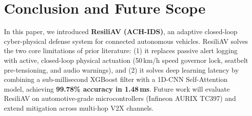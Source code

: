 \documentclass[conference]{IEEEtran}
\begin{document}
\section{Conclusion and Future Scope}
In this paper, we introduced \textbf{ResiliAV (ACH-IDS)}, an adaptive closed-loop cyber-physical defense system for connected autonomous vehicles. ResiliAV solves the two core limitations of prior literature: (1) it replaces passive alert logging with active, closed-loop physical actuation (50\,km/h speed governor lock, seatbelt pre-tensioning, and audio warnings), and (2) it solves deep learning latency by combining a sub-millisecond XGBoost filter with a 1D-CNN Self-Attention model, achieving \textbf{99.78\% accuracy in 1.48\,ms}. Future work will evaluate ResiliAV on automotive-grade microcontrollers (Infineon AURIX TC397) and extend mitigation across multi-hop V2X channels.



\end{document}
